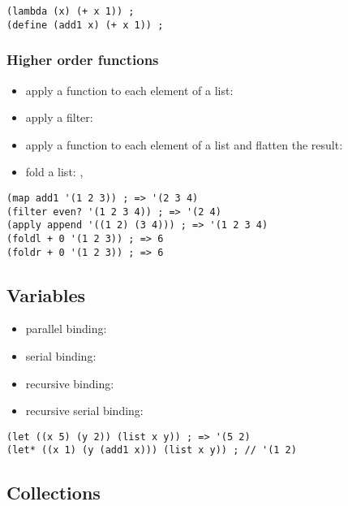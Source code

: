 \documentclass[a4paper,landscape,10pt]{article}
\begin{document}
\begin{multicols*}{2}
  \begin{lstlisting}[language=Racket]
(lambda (x) (+ x 1)) ;
(define (add1 x) (+ x 1)) ;
\end{lstlisting}

  \subsubsection{Higher order functions}

  \begin{itemize}
    \item apply a function to each element of a list: 
    \item apply a filter: 
    \item apply a function to each element of a list and flatten the result: 
    \item fold a list: , 
  \end{itemize}

  \begin{lstlisting}[language=Racket]
(map add1 '(1 2 3)) ; => '(2 3 4)
(filter even? '(1 2 3 4)) ; => '(2 4)
(apply append '((1 2) (3 4))) ; => '(1 2 3 4)
(foldl + 0 '(1 2 3)) ; => 6
(foldr + 0 '(1 2 3)) ; => 6
\end{lstlisting}


  \subsection{Variables}

  \begin{itemize}
    \item parallel binding: 
    \item serial binding: 
    \item recursive binding: 
    \item recursive serial binding: 
  \end{itemize}

  \begin{lstlisting}[language=Racket]
(let ((x 5) (y 2)) (list x y)) ; => '(5 2)
(let* ((x 1) (y (add1 x))) (list x y)) ; // '(1 2)
\end{lstlisting}

  \switchcolumn

  \subsection{Collections}


\end{multicols*}
\end{document}

